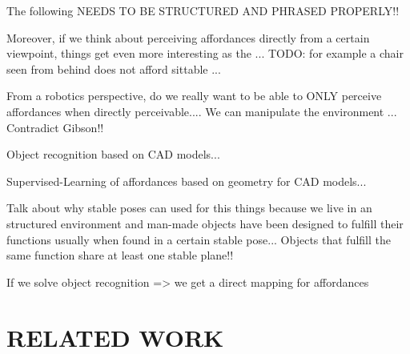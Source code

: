 \documentclass[a4paper, 10pt, conference]{ieeeconf}      %
\begin{document}
The following NEEDS TO BE STRUCTURED AND PHRASED PROPERLY!!

\hspace{5 mm}

Moreover, if we think about perceiving affordances directly from a certain viewpoint, 
things get even more interesting as the ... TODO: for example a chair seen from behind does not afford sittable ...

\hspace{2 mm}

From a robotics perspective, do we really want to be able to ONLY perceive affordances when directly perceivable.... We can manipulate
the environment ... Contradict Gibson!!

\hspace{2 mm}

Object recognition based on CAD models...

\hspace{2 mm}

Supervised-Learning of affordances based on geometry for CAD models...

\hspace{2 mm}

Talk about why stable poses can used for this things because we live in an structured environment and man-made objects have been
designed to fulfill their functions usually when found in a certain stable pose... Objects that fulfill the same function share
at least one stable plane!!

\hspace{2 mm}

If we solve object recognition => we get a direct mapping for affordances

\hspace{2 mm}



\section{RELATED WORK}
\end{document}

